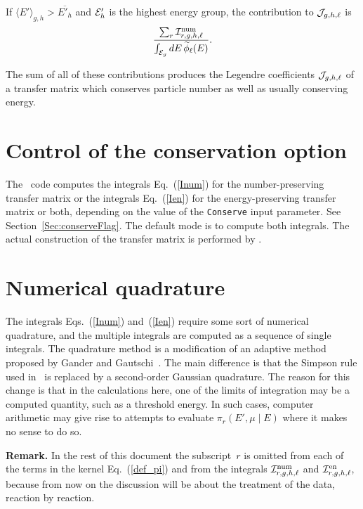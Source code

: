If $\langle E' \rangle_{g,h} > \overline {E'_h}$ and ${\cal E}'_h$
is the highest energy group, the contribution to ${\cal J}_{g,h,\ell}$
is
$$
  \frac{ \sum_r {\cal I}^{\text{num}}_{r,g,h,\ell} }
       { \int_{{\cal E}_g} dE \, \widetilde \phi_\ell(E) }.
$$

The sum of all of these contributions produces the Legendre
coefficients ${\cal J}_{g,h,\ell}$ of a transfer matrix which conserves
particle number as well as usually conserving energy.

\section{Control of the conservation option}
The \gettransfer\ code computes the integrals Eq.~(\ref{Inum})
for the number-preserving transfer matrix or the
integrals Eq.~(\ref{Ien}) for the energy-preserving transfer matrix
or both, depending on the value of the \texttt{Conserve}
input parameter.  See Section~\ref{Sec:conserveFlag}.
 The default mode is to
compute both integrals.  The actual construction
of the transfer matrix is performed by \xndfgen.

\section{Numerical quadrature}
The integrals Eqs.~(\ref{Inum}) and~(\ref{Ien}) require some sort
of numerical quadrature, and the multiple integrals are computed as
a sequence of single integrals.  The quadrature method is a modification of an
adaptive method proposed by Gander and Gautschi~\cite{Gander}.  The
main difference is that the Simpson rule
used in~\cite{Gander} is replaced by a second-order Gaussian quadrature.
The reason for this change is that in the calculations here,
one of the limits of integration may be a computed quantity,
such as a threshold energy.  In such cases, computer arithmetic may
give rise to attempts to evaluate $\pi_r(E', \mu \mid E)$
where it makes no sense to do so.

\textbf{Remark.} In the rest of this document the
subscript~$r$ is omitted from each of the terms in the kernel
Eq.~(\ref{def_pi}) and from the integrals
${\cal I}^{\text{num}}_{r,g,h,\ell}$ and ${\cal I}^{\text{en}}_{r,g,h,\ell}$, because from now on the discussion will be
about the treatment of the data, reaction by reaction.

